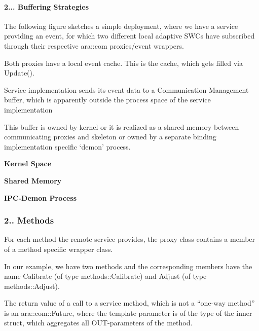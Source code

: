 \paragraph*{2... Buffering Strategies}


\begin{DoxyItemize}
\item The following figure sketches a simple deployment, where we have a service providing an event, for which two different local adaptive S\+W\+Cs have subscribed through their respective ara\+::com proxies/event wrappers.
\item Both proxies have a local event cache. This is the cache, which gets filled via Update().
\item Service implementation sends its event data to a Communication Management buffer, which is apparently outside the process space of the service implementation
\end{DoxyItemize}


\begin{DoxyItemize}
\item This buffer is owned by kernel or it is realized as a shared memory between communicating proxies and skeleton or owned by a separate binding implementation specific ‘demon’ process.
\begin{DoxyItemize}
\item {\bfseries Kernel Space}
\item {\bfseries Shared Memory}
\item {\bfseries I\+P\+C-\/\+Demon Process}
\end{DoxyItemize}
\end{DoxyItemize}

\subsubsection*{2.. Methods}


\begin{DoxyItemize}
\item For each method the remote service provides, the proxy class contains a member of a method specific wrapper class.
\item In our example, we have two methods and the corresponding members have the name Calibrate (of type methods\+::\+Calibrate) and Adjust (of type methods\+::\+Adjust).
\end{DoxyItemize}


\begin{DoxyItemize}
\item The return value of a call to a service method, which is not a “one-\/way method” is an ara\+::com\+::\+Future, where the template parameter is of the type of the inner struct, which aggregates all O\+U\+T-\/parameters of the method.
\end{DoxyItemize}

